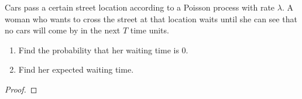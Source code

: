 \begin{problem}{5.44}
  Cars pass a certain street location according to a Poisson process with rate $\lambda$.
  A woman who wants to cross the street at that location waits until she can see that
  no cars will come by in the next $T$ time units.
  \begin{enumerate}
    \item Find the probability that her waiting time is 0.
    \item Find her expected waiting time.
  \end{enumerate}
\end{problem}

\begin{proof}
\end{proof}
\newpage
